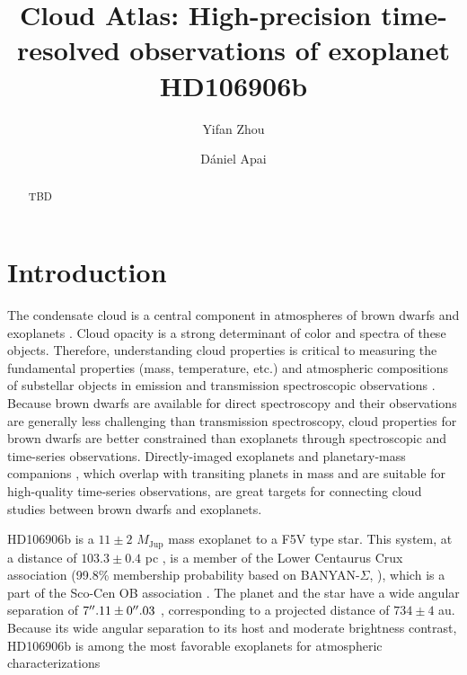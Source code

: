 \documentclass[twocolumn]{aastex62}
\newcommand{\mjup}{\ensuremath{M_\mathrm{Jup}}\xspace}
\newcommand{\editHL}[1]{{\color{blue}#1}}
\begin{document}
\title{Cloud Atlas: High-precision time-resolved observations of exoplanet HD106906b}


\author{Yifan Zhou}

\author{D\'aniel Apai}

\begin{abstract}
TBD
\end{abstract}

\keywords{}

\section{Introduction}


\editHL{The condensate cloud is a central component in atmospheres of brown dwarfs and exoplanets \citep[e.g.,][]{Morley2012,Marley2013,Marley2015}. Cloud opacity is a strong determinant of color and spectra of these objects. Therefore, understanding cloud properties is critical to measuring the fundamental properties (mass, temperature, etc.)  and atmospheric compositions of substellar objects in emission and transmission spectroscopic observations \citep{Ingraham2014,Kreidberg2014a,Stevenson2016,DeWit2016,Samland2017}. Because brown dwarfs are available for direct spectroscopy and their observations are generally less challenging than transmission spectroscopy, cloud properties for brown dwarfs are better constrained than exoplanets through spectroscopic \citep[e.g.,][]{Cushing2008,Stephens2009} and time-series \citep[e.g.,][]{Buenzli2012,Apai2013,Biller2017,Apai2017} observations. Directly-imaged exoplanets and planetary-mass companions \citep[e.g.,][]{Chauvin2004,Marois2008a,Marois2010,Macintosh2015a}, which overlap with transiting planets in mass and are suitable for high-quality time-series observations, are great targets for connecting cloud studies between brown dwarfs and exoplanets.}

HD106906b is a $11\pm2$ \mjup  mass exoplanet \citep{Bailey2013} to a F5V type star. This system, at a distance of $103.3\pm0.4$ pc \citep{Gaia2016,Gaia2018}, is a member of the Lower Centaurus Crux association (99.8\% membership probability based on BANYAN-$\Sigma$, \citealt{Gagne2018} ), which is a part of the Sco-Cen OB association \citep[age: $15\pm3$ Myr,][]{Pecaut2016}. The planet and the star have a wide angular separation of $7\mbox{$^{\prime\prime}$}.11\pm0\mbox{$^{\prime\prime}$}.03$ \citep{Bailey2013}, corresponding to a projected distance of $734\pm4$ au. Because its wide angular separation to its host and moderate brightness contrast, HD106906b is among the most favorable exoplanets for atmospheric characterizations \citep[e.g., ][]{Bailey2013,Kalas2015,Wu2016,Daemgen2017}
\end{document}

